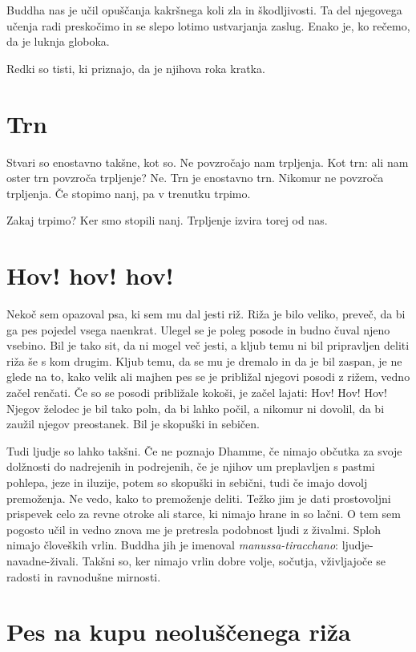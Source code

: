 Buddha nas je učil opuščanja kakršnega koli zla in škodljivosti. Ta del njegovega učenja radi preskočimo in se slepo lotimo ustvarjanja zaslug. Enako je, ko rečemo, da je luknja globoka.

Redki so tisti, ki priznajo, da je njihova roka kratka.

\section{Trn}

Stvari so enostavno takšne, kot so. Ne povzročajo nam trpljenja. Kot trn: ali nam oster trn povzroča trpljenje? Ne. Trn je enostavno trn. Nikomur ne povzroča trpljenja. Če stopimo nanj, pa v trenutku trpimo.

Zakaj trpimo? Ker smo stopili nanj. Trpljenje izvira torej od nas.

\section{Hov! hov! hov!}

Nekoč sem opazoval psa, ki sem mu dal jesti riž. Riža je bilo veliko, preveč, da bi ga pes pojedel vsega naenkrat. Ulegel se je poleg posode in budno čuval njeno vsebino. Bil je tako sit, da ni mogel več jesti, a kljub temu ni bil pripravljen deliti riža še s kom drugim. Kljub temu, da se mu je dremalo in da je bil zaspan, je ne glede na to, kako velik ali majhen pes se je približal njegovi posodi z rižem, vedno začel renčati. Če so se posodi približale kokoši, je začel lajati: Hov! Hov! Hov! Njegov želodec je bil tako poln, da bi lahko počil, a nikomur ni dovolil, da bi zaužil njegov preostanek. Bil je skopuški in sebičen.

Tudi ljudje so lahko takšni. Če ne poznajo Dhamme, če nimajo občutka za svoje dolžnosti do nadrejenih in podrejenih, če je njihov um preplavljen s pastmi pohlepa, jeze in iluzije, potem so skopuški in sebični, tudi če imajo dovolj premoženja. Ne vedo, kako to premoženje deliti. Težko jim je dati prostovoljni prispevek celo za revne otroke ali starce, ki nimajo hrane in so lačni. O tem sem pogosto učil in vedno znova me je pretresla podobnost ljudi z živalmi. Sploh nimajo človeških vrlin. Buddha jih je imenoval \emph{manussa-tiracchano}: ljudje-navadne-živali. Takšni so, ker nimajo vrlin dobre volje, sočutja, vživljajoče se radosti in ravnodušne mirnosti.

\section{Pes na kupu neoluščenega riža}

